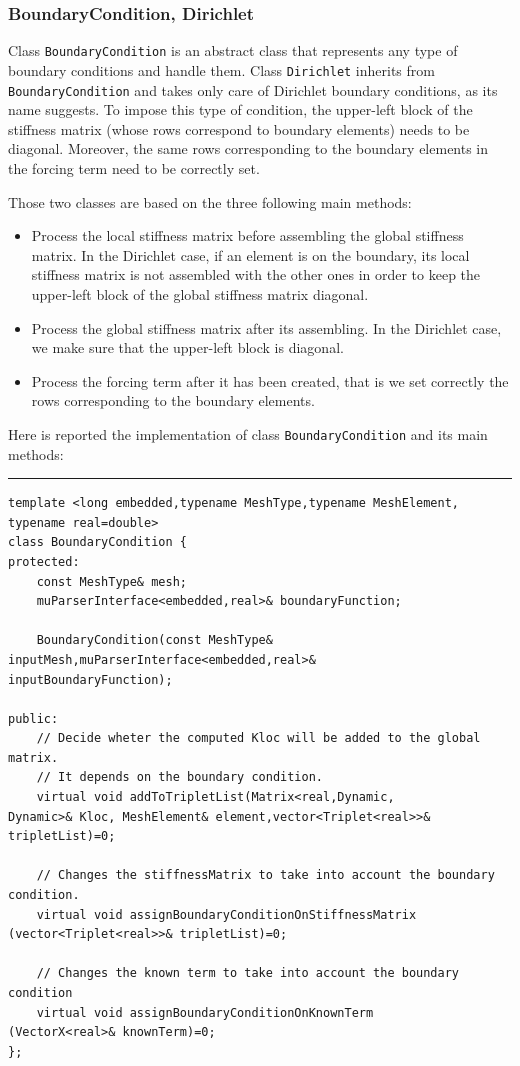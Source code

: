\subsubsection{BoundaryCondition, Dirichlet}
Class \verb|BoundaryCondition| is an abstract class that represents any type of boundary conditions and handle them. Class \verb|Dirichlet| inherits from \verb|BoundaryCondition| and takes only care of Dirichlet boundary conditions, as its name suggests. To impose this type of condition, the upper-left block of the stiffness matrix (whose rows correspond to boundary elements) needs to be diagonal. Moreover, the same rows corresponding to the boundary elements in the forcing term need to be correctly set. 

Those two classes are based on the three following main methods: 
\begin{itemize}
\item Process the local stiffness matrix before assembling the global stiffness matrix. In the Dirichlet case, if an element is on the boundary, its local stiffness matrix is not assembled with the other ones in order to keep the upper-left block of the global stiffness matrix diagonal. 
\item Process the global stiffness matrix after its assembling. In the Dirichlet case, we make sure that the upper-left block is diagonal. 
\item Process the forcing term after it has been created, that is we set correctly the rows corresponding to the boundary elements. 
\end{itemize}

Here is reported the implementation of class \verb|BoundaryCondition| and its main methods:

\noindent\rule{16cm}{1pt}
\begin{lstlisting}[caption=File \texttt{BoundaryCondition.h}]
template <long embedded,typename MeshType,typename MeshElement,
typename real=double>
class BoundaryCondition {
protected:
    const MeshType& mesh;
    muParserInterface<embedded,real>& boundaryFunction;

    BoundaryCondition(const MeshType& inputMesh,muParserInterface<embedded,real>& 
inputBoundaryFunction);

public:
    // Decide wheter the computed Kloc will be added to the global matrix.
    // It depends on the boundary condition.	
    virtual void addToTripletList(Matrix<real,Dynamic,
Dynamic>& Kloc, MeshElement& element,vector<Triplet<real>>& 
tripletList)=0;
	
    // Changes the stiffnessMatrix to take into account the boundary condition.
    virtual void assignBoundaryConditionOnStiffnessMatrix
(vector<Triplet<real>>& tripletList)=0;
	
    // Changes the known term to take into account the boundary condition
    virtual void assignBoundaryConditionOnKnownTerm
(VectorX<real>& knownTerm)=0; 		
};

\end{lstlisting}

